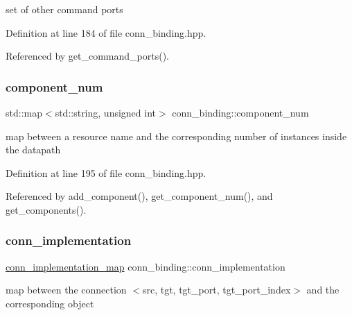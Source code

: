 set of other command ports 



Definition at line 184 of file conn\+\_\+binding.\+hpp.



Referenced by get\+\_\+command\+\_\+ports().

\mbox{\label{classconn__binding_a9bda1f1b0572a64f1f47e32079bbfb36}} 
\subsubsection{\texorpdfstring{component\+\_\+num}{component\_num}}
{\footnotesize\ttfamily std\+::map$<$std\+::string, unsigned int$>$ conn\+\_\+binding\+::component\+\_\+num\hspace{0.3cm}{\ttfamily [protected]}}



map between a resource name and the corresponding number of instances inside the datapath 



Definition at line 195 of file conn\+\_\+binding.\+hpp.



Referenced by add\+\_\+component(), get\+\_\+component\+\_\+num(), and get\+\_\+components().

\mbox{\label{classconn__binding_a029160ea56f0b1c2f3044e467276daa1}} 
\subsubsection{\texorpdfstring{conn\+\_\+implementation}{conn\_implementation}}
{\footnotesize\ttfamily \hyperlink{classconn__binding_a352bfe56b0a7f7b3c9763bf90c87f785}{conn\+\_\+implementation\+\_\+map} conn\+\_\+binding\+::conn\+\_\+implementation\hspace{0.3cm}{\ttfamily [protected]}}



map between the connection $<$src, tgt, tgt\+\_\+port, tgt\+\_\+port\+\_\+index$>$ and the corresponding object 



